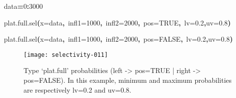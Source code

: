 \documentclass[letterpaper, 12pt]{article}
\newenvironment{Hinput}%
{}%
{}%
\newenvironment{Hchunk}%
{\vspace{0.5em}\par\begin{flushleft}}%
{\end{flushleft}}%
\newcommand{\hlnumber}[1]{\textcolor[rgb]{0.0823529411764706,0.0784313725490196,0.709803921568627}{#1}}%
\newcommand{\hlfunctioncall}[1]{\textcolor[rgb]{1,0,0}{#1}}%
\newcommand{\hlkeyword}[1]{\textcolor[rgb]{0,0,0}{\textbf{#1}}}%
\newcommand{\hlargument}[1]{\textcolor[rgb]{0.694117647058824,0.247058823529412,0.0196078431372549}{#1}}%
\newcommand{\hlassignement}[1]{\textcolor[rgb]{0.215686274509804,0.215686274509804,0.384313725490196}{\textbf{#1}}}%
\newcommand{\hlsymbol}[1]{\textcolor[rgb]{0,0,0}{#1}}%
\newcommand{\hlprompt}[1]{\textcolor[rgb]{0,0,0}{#1}}%
\begin{document}
\begin{Hchunk}
\begin{normalsize}
\begin{Hinput}
\ttfamily\noindent
\hlprompt{\usebox{\hlnormalsizeboxgreaterthan}{\ }}\hlsymbol{data}\hlassignement{=}\hlnumber{0}\hlkeyword{:}\hlnumber{3000}\mbox{}
\normalfont
\end{Hinput}


\begin{Hinput}
\ttfamily\noindent
\hlprompt{\usebox{\hlnormalsizeboxgreaterthan}{\ }}\hlfunctioncall{plat.full.sel}\hlkeyword{(}\hlargument{x}\hlargument{=}\hlsymbol{data}\hlkeyword{,}{\ }\hlargument{infl1}\hlargument{=}\hlnumber{1000}\hlkeyword{,}{\ }\hlargument{infl2}\hlargument{=}\hlnumber{2000}\hlkeyword{,}{\ }\hlargument{pos}\hlargument{=}\hlnumber{TRUE}\hlkeyword{,}{\ }\hlargument{lv}\hlargument{=}\hlnumber{0.2}\hlkeyword{,}\hlargument{uv}\hlargument{=}\hlnumber{0.8}\hlkeyword{)}\mbox{}
\normalfont
\end{Hinput}


\begin{Hinput}
\ttfamily\noindent
\hlprompt{\usebox{\hlnormalsizeboxgreaterthan}{\ }}\hlfunctioncall{plat.full.sel}\hlkeyword{(}\hlargument{x}\hlargument{=}\hlsymbol{data}\hlkeyword{,}{\ }\hlargument{infl1}\hlargument{=}\hlnumber{1000}\hlkeyword{,}{\ }\hlargument{infl2}\hlargument{=}\hlnumber{2000}\hlkeyword{,}{\ }\hlargument{pos}\hlargument{=}\hlnumber{FALSE}\hlkeyword{,}{\ }\hlargument{lv}\hlargument{=}\hlnumber{0.2}\hlkeyword{,}\hlargument{uv}\hlargument{=}\hlnumber{0.8}\hlkeyword{)}\mbox{}
\normalfont
\end{Hinput}


\end{normalsize}
\end{Hchunk}

\begin{figure}[h]
\vspace{-20pt}
\begin{center}
\texttt{[image: selectivity-011]}
\end{center}
\vspace{-30pt}
\caption{Type `plat.full' probabilities (left -> pos=TRUE |  right -> pos=FALSE). In this example, minimum and maximum probabilities are respectively lv=0.2 and uv=0.8.}
\vspace{-10pt}
\label{fig5}
\end{figure}
\end{document}
